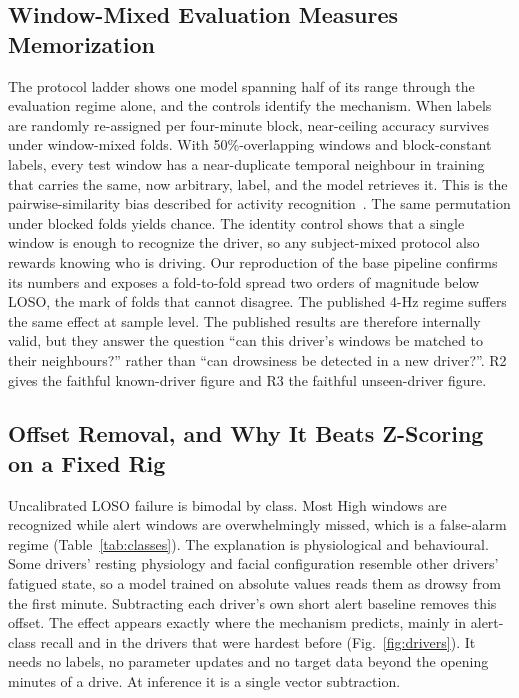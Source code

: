 \documentclass[journal]{IEEEtran}
\newcommand{\rtwo}{R2}
\newcommand{\rthree}{R3}
\begin{document}
\subsection{Window-Mixed Evaluation Measures Memorization}
The protocol ladder shows one model spanning half of its range through the
evaluation regime alone, and the controls identify the mechanism. When labels
are randomly re-assigned per four-minute block, near-ceiling accuracy survives
under window-mixed folds. With 50\%-overlapping windows and block-constant
labels, every test window has a near-duplicate temporal neighbour in training
that carries the same, now arbitrary, label, and the model retrieves it. This
is the pairwise-similarity bias described for activity
recognition~\cite{hammerla2015stick}. The same permutation under blocked folds
yields chance. The identity control shows that a single window is enough to
recognize the driver, so any subject-mixed protocol also rewards knowing who
is driving. Our reproduction of the base pipeline confirms its numbers and
exposes a fold-to-fold spread two orders of magnitude below LOSO, the mark of
folds that cannot disagree. The published 4-Hz regime suffers the same effect
at sample level. The published results are therefore internally valid, but
they answer the question ``can this driver's windows be matched to their
neighbours?'' rather than ``can drowsiness be detected in a new driver?''.
\rtwo{} gives the faithful known-driver figure and \rthree{} the faithful
unseen-driver figure.

\subsection{Offset Removal, and Why It Beats Z-Scoring on a Fixed Rig}
\label{sec:offsetremoval}
\label{sec:transductive}
Uncalibrated LOSO failure is bimodal by class. Most High windows are
recognized while alert windows are overwhelmingly missed, which is a
false-alarm regime (Table~\ref{tab:classes}). The explanation is physiological
and behavioural. Some drivers' resting physiology and facial configuration
resemble other drivers' fatigued state, so a model trained on absolute values
reads them as drowsy from the first minute. Subtracting each driver's own
short alert baseline removes this offset. The effect appears exactly where the
mechanism predicts, mainly in alert-class recall and in the drivers that were
hardest before (Fig.~\ref{fig:drivers}). It needs no labels, no parameter
updates and no target data beyond the opening minutes of a drive. At inference
it is a single vector subtraction.
\end{document}
